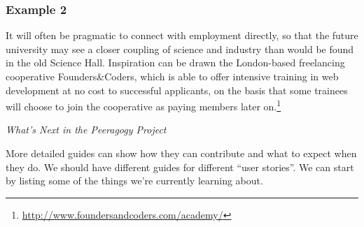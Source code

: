\subsubsection*{Example 2} It will often be pragmatic to connect
 with employment directly, so that
the future university may see a closer coupling of science and
industry than would be found in the old Science Hall.  Inspiration can
be drawn the London-based freelancing cooperative Founders\&Coders,
which is able to offer intensive training in web development at no
cost to successful applicants, on the basis that some trainees will
choose to join the cooperative as paying members later
on.\footnote{\url{http://www.foundersandcoders.com/academy/}}


\begin{framed}
\noindent 
\emph{What's Next in the Peeragogy Project}
\begin{collectinmacro}{\NewcomerWN}{}{}
More detailed guides can show   how they can contribute and what to expect when they do. We should have different guides for different ``user stories''. We can start by listing some of the things we're currently learning about.
\end{collectinmacro}
\NewcomerWN
\end{framed}

